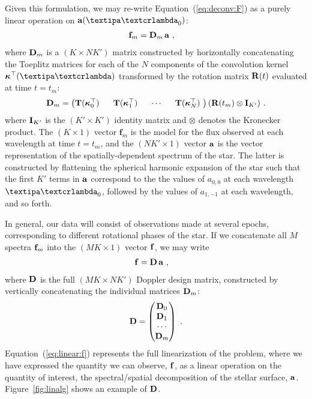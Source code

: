 \documentclass[modern]{aastex631}
\begin{document}
Given this formulation, we may re-write Equation~(\ref{eq:deconv:F}) as a purely linear operation on $\alm(\lnlam_0)$:
%
\begin{align}
    \label{eq:linear:ft}
    {\ensuremath{\mathbf{f}}}_m
     & =
    {\mathbf{D}}_m
    \,
    {\mathbf{a}}
    \hskip 0.33em,
\end{align}
%
where ${\mathbf{D}}_m$ is a $(K \times N K')$ matrix constructed by horizontally concatenating the Toeplitz matrices for each of the $N$ components of the convolution kernel $\kT(\lnlam)$ transformed by the rotation matrix ${\mathbf{R}}(t)$ evaluated at time $t = t_m$:
%
\begin{align}
    \label{eq:linear:Dm}
    {\ensuremath{\mathbf{D}}}_m =
    \begin{pmatrix}
        {\ensuremath{\mathbf{T}}}(\boldsymbol{\kappa}^\top_0)
        \hskip 0.33em
         &
        \hskip 0.33em
        {\mathbf{T}}(\boldsymbol{\kappa}^\top_1)
        \hskip 0.33em
         &
        \hskip 0.33em
        \cdots
        \hskip 0.33em
         &
        \hskip 0.33em
        {\mathbf{T}}(\boldsymbol{\kappa}^\top_N)
        \hskip 0.33em
    \end{pmatrix}
    ({\mathbf{R}}(t_m) \otimes {\ensuremath{\mathbf{I}}}_{K'})
    \hskip 0.33em.
\end{align}
%
where ${\mathbf{I}}_{K'}$ is the $(K' \times K')$ identity matrix and $\otimes$ denotes the Kronecker product.
%
The $(K \times 1)$ vector $\mathbf{f}_m$ is the model for the flux observed at each wavelength at time $t = t_m$, and the $(N K' \times 1)$ vector ${\mathbf{a}}$ is the vector representation of the spatially-dependent spectrum of the star. 
The latter is constructed by flattening the spherical harmonic expansion of the star such that the first $K'$ terms in ${\mathbf{a}}$ correspond to the the values of $a_{0,0}$ at each wavelength $\lnlam_0$, followed by the values of $a_{1,-1}$ at each wavelength, and so forth.

In general, our data will consist of observations made at several epochs, corresponding to different rotational phases of the star.
If we concatenate all $M$ spectra ${\mathbf{f}}_m$ into the $(MK \times 1)$ vector ${\mathbf{f}}$, we may write
%
\begin{align}
    \label{eq:linear:f}
    {\ensuremath{\mathbf{f}}}
     & =
    {\mathbf{D}}
    \,
    {\mathbf{a}}
    \hskip 0.33em,
\end{align}
%
where ${\mathbf{D}}$ is the full $(MK \times N K')$ Doppler design matrix, constructed by vertically concatenating the individual matrices ${\mathbf{D}}_m$:
%
%
\begin{align}
    \label{eq:linear:D}
    {\ensuremath{\mathbf{D}}} =
    \begin{pmatrix}
        {\ensuremath{\mathbf{D}}}_0
        \\
        {\mathbf{D}}_1
        \\
        \cdots
        \\
        {\mathbf{D}}_m
    \end{pmatrix}
    \hskip 0.33em.
\end{align}
%
%
Equation~(\ref{eq:linear:f}) represents the full linearization of the problem, where we have expressed the quantity we can observe, ${\mathbf{f}}$, as a linear operation on the quantity of interest, the spectral/spatial decomposition of the stellar surface, ${\mathbf{a}}$. 
Figure~\ref{fig:linalg} shows an example of ${\mathbf{D}}$.
\end{document}
